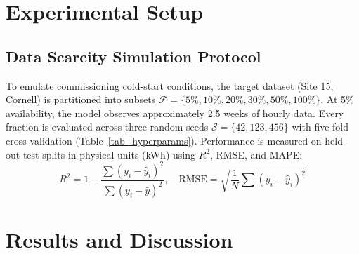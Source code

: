 \documentclass[conference]{IEEEtran}
\begin{document}
\section{Experimental Setup}
\subsection{Data Scarcity Simulation Protocol}
To emulate commissioning cold-start conditions, the target dataset (Site 15, Cornell) is partitioned into subsets $\mathcal{F} = \{5\%, 10\%, 20\%, 30\%, 50\%, 100\%\}$. At 5\% availability, the model observes approximately 2.5 weeks of hourly data. Every fraction is evaluated across three random seeds $\mathcal{S} = \{42, 123, 456\}$ with five-fold cross-validation (Table~\ref{tab_hyperparams}). Performance is measured on held-out test splits in physical units (kWh) using $R^2$, RMSE, and MAPE:
\begin{equation}
R^2 = 1 - \frac{\sum (y_i - \hat{y}_i)^2}{\sum (y_i - \bar{y})^2}, \quad \text{RMSE} = \sqrt{\frac{1}{N}\sum (y_i - \hat{y}_i)^2}
\label{eq_metrics}
\end{equation}

\begin{table}[t]
\caption{Cross-Climate Data Efficiency Results (Tempe $\to$ Cornell)}
\centering
{}
\label{tab_efficiency}
\end{table}

\section{Results and Discussion}
\end{document}
